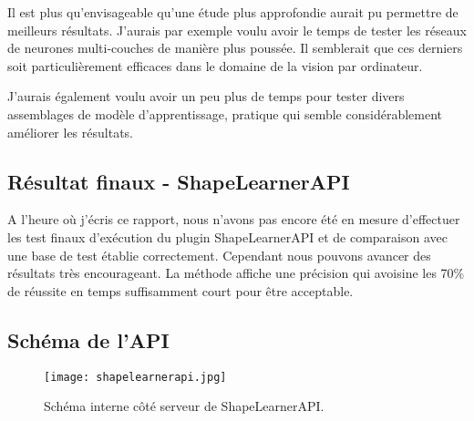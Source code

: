 Il est plus qu'envisageable qu'une étude plus approfondie aurait pu permettre de meilleurs résultats. J'aurais par exemple voulu avoir le temps de tester les réseaux de neurones multi-couches de manière plus poussée. Il semblerait que ces derniers soit particulièrement efficaces dans le domaine de la vision par ordinateur.

J'aurais également voulu avoir un peu plus de temps pour tester divers assemblages de modèle d'apprentissage, pratique qui semble considérablement améliorer les résultats.

\subsection{Résultat finaux - ShapeLearnerAPI}

A l'heure où j'écris ce rapport, nous n'avons pas encore été en mesure d'effectuer les test finaux d'exécution du plugin ShapeLearnerAPI et de comparaison avec une base de test établie correctement. Cependant nous pouvons avancer des résultats très encourageant. La méthode affiche une précision qui avoisine les 70\% de réussite en temps suffisamment court pour être acceptable.

\subsection{Schéma de l'API}

 \begin{figure}[H]
    \centering
    \texttt{[image: shapelearnerapi.jpg]}
	\caption{Schéma interne côté serveur de ShapeLearnerAPI.}\label{image.ShapeAPIScheme} 
\end{figure}

\clearpage